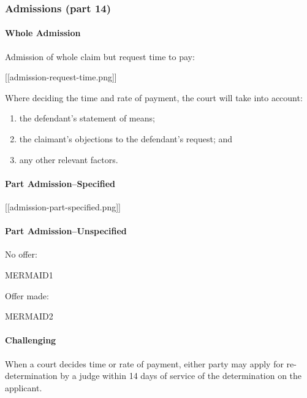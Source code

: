 \documentclass[
]{article}
\providecommand{\tightlist}{%
  \setlength{\itemsep}{0pt}\setlength{\parskip}{0pt}}
\begin{document}
\hypertarget{admissions-part-14}{%
\subsubsection{Admissions (part 14)}\label{admissions-part-14}}

\hypertarget{whole-admission}{%
\paragraph{Whole Admission}\label{whole-admission}}

Admission of whole claim but request time to pay:

{[}{[}admission-request-time.png{]}{]}

Where deciding the time and rate of payment, the court will take into
account:

\begin{enumerate}
\def\labelenumi{\arabic{enumi}.}
\tightlist
\item
  the defendant's statement of means;
\item
  the claimant's objections to the defendant's request; and
\item
  any other relevant factors.
\end{enumerate}

\hypertarget{part-admissionspecified}{%
\paragraph{Part Admission--Specified}\label{part-admissionspecified}}

{[}{[}admission-part-specified.png{]}{]}

\hypertarget{part-admissionunspecified}{%
\paragraph{Part
Admission--Unspecified}\label{part-admissionunspecified}}

No offer:

MERMAID1

Offer made:

MERMAID2

\hypertarget{challenging}{%
\paragraph{Challenging}\label{challenging}}

When a court decides time or rate of payment, either party may apply for
re-determination by a judge within 14 days of service of the
determination on the applicant.
\end{document}
